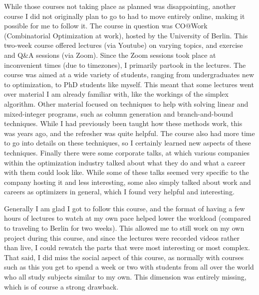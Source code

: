 \documentclass[a4paper,12pt]{article}
\begin{document}
While those courses not taking place as planned was disappointing, another course I did not originally plan to go to had to move entirely online, making it possible for me to follow it. The course in question was CO@Work (Combinatorial Optimization at work), hosted by the University of Berlin. This two-week course offered lectures (via Youtube) on varying topics, and exercise and Q\&A sessions (via Zoom). Since the Zoom sessions took place at inconvenient times (due to timezones), I primarily partook in the lectures. The course was aimed at a wide variety of students, ranging from undergraduates new to optimization, to PhD students like myself. This meant that some lectures went over material I am already familiar with, like the workings of the simplex algorithm. Other material focused on techniques to help with solving linear and mixed-integer programs, such as column generation and branch-and-bound techniques. While I had previously been taught how these methods work, this was years ago, and the refresher was quite helpful. The course also had more time to go into details on these techniques, so I certainly learned new aspects of these techniques. Finally there were some corporate talks, at which various companies within the optimization industry talked about what they do and what a career with them could look like. While some of these talks seemed very specific to the company hosting it and less interesting, some also simply talked about work and careers as optimizers in general, which I found very helpful and interesting. 

Generally I am glad I got to follow this course, and the format of having a few hours of lectures to watch at my own pace helped lower the workload (compared to traveling to Berlin for two weeks). This allowed me to still work on my own project during this course, and since the lectures were recorded videos rather than live, I could rewatch the parts that were most interesting or most complex. That said, I did miss the social aspect of this course, as normally with courses such as this you get to spend a week or two with students from all over the world who all study subjects similar to my own. This dimension was entirely missing, which is of course a strong drawback. 

\bigskip
\end{document}
